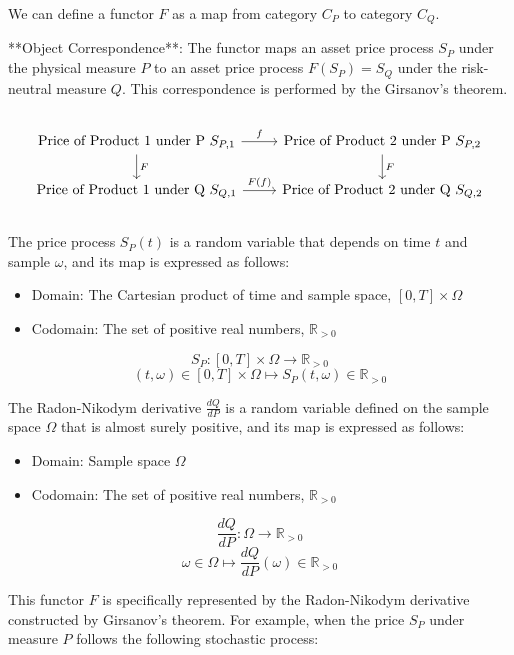 \documentclass[uplatex,a4j,12pt,dvipdfmx]{jsarticle}
\begin{document}
We can define a functor $F$ as a map from category $C_{P}$ to category $C_{Q}$.

**Object Correspondence**:
The functor maps an asset price process $S_{P}$ under the physical measure $P$ to an asset price process $F(S_{P}) = S_{Q}$ under the risk-neutral measure $Q$. This correspondence is performed by the Girsanov's theorem.

${}$

$$
	\begin{tikzcd}
		\text{Price of Product 1 under P } S_{P,1} \arrow[r, "f"] \arrow[d, "F"] & \text{Price of Product 2 under P } S_{P,2} \arrow[d, "F"] \\
		\text{Price of Product 1 under Q } S_{Q,1} \arrow[r, "F(f)"] & \text{Price of Product 2 under Q } S_{Q,2}
	\end{tikzcd}
$$

${}$

The price process $S_{P}(t)$ is a random variable that depends on time $t$ and sample $\omega$, and its map is expressed as follows:

\begin{itemize}
	\item Domain: The Cartesian product of time and sample space, $[0, T] \times \Omega$
	\item Codomain: The set of positive real numbers, $\mathbb{R}_{>0}$
\end{itemize}

$$
	S_{P}: [0, T] \times \Omega \to \mathbb{R}_{>0}
$$
$$
	(t, \omega) \in [0, T] \times \Omega \mapsto S_{P}(t, \omega) \in \mathbb{R}_{>0}
$$

The Radon-Nikodym derivative $\frac{dQ}{dP}$ is a random variable defined on the sample space $\Omega$ that is almost surely positive, and its map is expressed as follows:

\begin{itemize}
	\item Domain: Sample space $\Omega$
	\item Codomain: The set of positive real numbers, $\mathbb{R}_{>0}$
\end{itemize}

$$
	\frac{dQ}{dP}: \Omega \to \mathbb{R}_{>0}
$$
$$
	\omega \in \Omega \mapsto \frac{dQ}{dP}(\omega) \in \mathbb{R}_{>0}
$$

This functor $F$ is specifically represented by the Radon-Nikodym derivative constructed by Girsanov's theorem.
For example, when the price $S_{P}$ under measure $P$ follows the following stochastic process:
\end{document}
